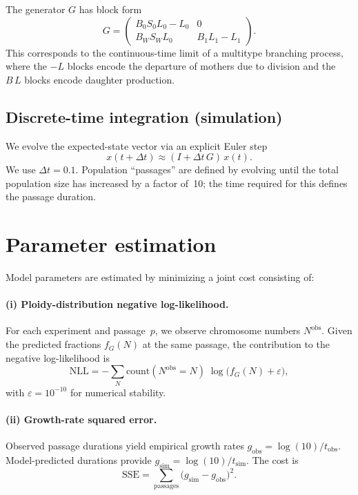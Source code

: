 \documentclass{article}
\begin{document}
The generator $G$ has block form
\[
G =
\begin{pmatrix}
B_0 S_0 L_0 - L_0 & 0 \\[6pt]
B_W S_W L_0 & B_1 L_1 - L_1
\end{pmatrix}.
\]
This corresponds to the continuous-time limit of a multitype branching process,
where the $-L$ blocks encode the departure of mothers due to division and the
$B\,L$ blocks encode daughter production.

\subsection*{Discrete-time integration (simulation)}

We evolve the expected-state vector via an explicit Euler step
\[
x(t+\Delta t) \approx (I + \Delta t \, G)\, x(t).
\]
We use $\Delta t = 0.1$.
Population “passages” are defined by evolving until the total population size
has increased by a factor of~10; the time required for this defines the passage
duration.

\bigskip

\section*{Parameter estimation}

Model parameters are estimated by minimizing a joint cost consisting of:

\paragraph{(i) Ploidy-distribution negative log-likelihood.}
For each experiment and passage~$p$, we observe chromosome numbers
$N^{\text{obs}}$.
Given the predicted fractions $f_G(N)$ at the same passage,
the contribution to the negative log-likelihood is
\[
\mathrm{NLL}
=
-
\sum_N 
\mathrm{count}(N^{\text{obs}}{=}N)
\;
\log\bigl(f_G(N)+\varepsilon\bigr),
\]
with $\varepsilon=10^{-10}$ for numerical stability.

\paragraph{(ii) Growth-rate squared error.}
Observed passage durations yield empirical growth rates
$g_{\mathrm{obs}} = \log(10)/t_{\mathrm{obs}}$.
Model-predicted durations provide
$g_{\mathrm{sim}} = \log(10)/t_{\mathrm{sim}}$.
The cost is
\[
\mathrm{SSE}
=
\sum_{\text{passages}}
\bigl(g_{\mathrm{sim}} - g_{\mathrm{obs}}\bigr)^{2}.
\]
\end{document}
